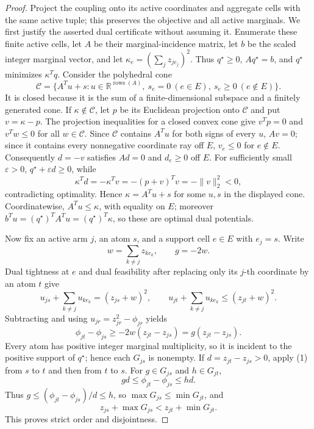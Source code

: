 \documentclass{article}
\begin{document}
\begin{proof}
Project the coupling onto its active coordinates and aggregate cells with the same active tuple; this preserves the objective and all active marginals.  We first justify the asserted dual certificate without assuming it.  Enumerate these finite active cells, let \(A\) be their marginal-incidence matrix, let \(b\) be the scaled integer marginal vector, and let \(\kappa_e=(\sum_jz_{je_j})^2\).  Thus \(q^\star\ge0\), \(Aq^\star=b\), and \(q^\star\) minimizes \(\kappa^Tq\).  Consider the polyhedral cone
\[
 \mathcal C=\{A^Tu+s:u\in\mathbb R^{\operatorname{rows}(A)},\ s_e=0\ (e\in E),\ s_e\ge0\ (e\notin E)\}.
\]
It is closed because it is the sum of a finite-dimensional subspace and a finitely generated cone.  If \(\kappa\notin\mathcal C\), let \(p\) be its Euclidean projection onto \(\mathcal C\) and put \(v=\kappa-p\).  The projection inequalities for a closed convex cone give \(v^Tp=0\) and \(v^Tw\le0\) for all \(w\in\mathcal C\).  Since \(\mathcal C\) contains \(A^Tu\) for both signs of every \(u\), \(Av=0\); since it contains every nonnegative coordinate ray off \(E\), \(v_e\le0\) for \(e\notin E\).  Consequently \(d=-v\) satisfies \(Ad=0\) and \(d_e\ge0\) off \(E\).  For sufficiently small \(\varepsilon>0\), \(q^\star+\varepsilon d\ge0\), while
\[
 \kappa^Td=-\kappa^Tv=-(p+v)^Tv=-\|v\|_2^2<0,
\]
contradicting optimality.  Hence \(\kappa=A^Tu+s\) for some \(u,s\) in the displayed cone.  Coordinatewise, \(A^Tu\le\kappa\), with equality on \(E\); moreover \(b^Tu=(q^\star)^TA^Tu=(q^\star)^T\kappa\), so these are optimal dual potentials.

Now fix an active arm \(j\), an atom \(s\), and a support cell \(e\in E\) with \(e_j=s\).  Write
\[
 w=\sum_{k\ne j}z_{ke_k},\qquad g=-2w.
\]
Dual tightness at \(e\) and dual feasibility after replacing only its \(j\)-th coordinate by an atom \(t\) give
\[
 u_{js}+\sum_{k\ne j}u_{ke_k}=(z_{js}+w)^2,
 \qquad
 u_{jt}+\sum_{k\ne j}u_{ke_k}\le(z_{jt}+w)^2.
\]
Subtracting and using \(u_{jr}=z_{jr}^2-\phi_{jr}\) yields
\[
 \phi_{jt}-\phi_{js}\ge-2w(z_{jt}-z_{js})=g(z_{jt}-z_{js}). \tag{1}
\]
Every atom has positive integer marginal multiplicity, so it is incident to the positive support of \(q^\star\); hence each \(G_{js}\) is nonempty.  If \(d=z_{jt}-z_{js}>0\), apply (1) from \(s\) to \(t\) and then from \(t\) to \(s\).  For \(g\in G_{js}\) and \(h\in G_{jt}\),
\[
 gd\le\phi_{jt}-\phi_{js}\le hd. \tag{2}
\]
Thus \(g\le(\phi_{jt}-\phi_{js})/d\le h\), so \(\max G_{js}\le\min G_{jt}\), and
\[
 z_{js}+\max G_{js}<z_{jt}+\min G_{jt}. \tag{3}
\]
This proves strict order and disjointness.


\end{proof}
\end{document}
